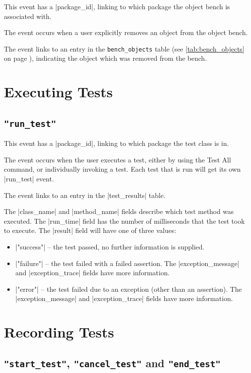 \documentclass{report}
\newcommand{\myref}[1]{\autoref{#1} on page \pageref*{#1}}
\newcommand{\tabref}[1]{\lstinline|#1| table (see \myref{tab:#1})}
\begin{document}
This event has a |package_id|, linking to which package the object
bench is associated with.

The event occurs when a user explicitly removes an object from the object bench.
  
The event links to an entry in the \tabref{bench_objects}, indicating
the object which was removed from the bench.

\section{Executing Tests}

\subsection{\lstinline!"run_test"!}

This event has a |package_id|, linking to which package the test class
is in.

The event occurs when the user executes a test, either by using the
Test All command, or individually invoking a test.  Each test that is
run will get its own |run_test| event.

The event links to an entry in the |test_results| table.


The |class_name| and |method_name| fields describe which test method was
executed.  The |run_time| field has the number of milliseconds that the test
took to execute.  The |result| field will have one of three values:

\begin{itemize}
\item |"success"| -- the test passed, no further information is supplied.
\item |"failure"| -- the test failed with a failed assertion.  The
  |exception_message| and |exception_trace| fields have more information.
\item |"error"| -- the test failed due to an exception (other than an assertion).  The
  |exception_message| and |exception_trace| fields have more information.
\end{itemize}

\section{Recording Tests}

\subsection{\lstinline!"start_test"!, \lstinline!"cancel_test"! and \lstinline!"end_test"!}
\end{document}
